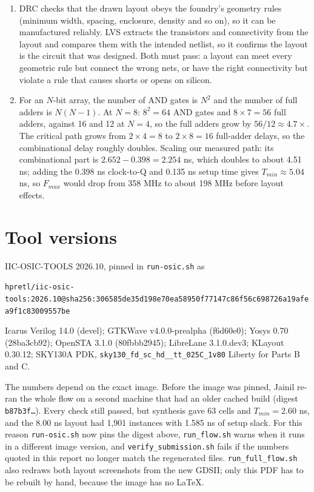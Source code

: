 \documentclass[10pt,a4paper]{article}
\newcommand{\code}[1]{\texttt{#1}}
\begin{document}
\begin{enumerate}[leftmargin=*,label=\textbf{\arabic*.}]
\item DRC checks that the drawn layout obeys the foundry's geometry rules (minimum width, spacing, enclosure, density and so on), so it can be manufactured reliably. LVS extracts the transistors and connectivity from the layout and compares them with the intended netlist, so it confirms the layout is the circuit that was designed. Both must pass: a layout can meet every geometric rule but connect the wrong nets, or have the right connectivity but violate a rule that causes shorts or opens on silicon.
\item For an $N$-bit array, the number of AND gates is $N^2$ and the number of full adders is $N(N-1)$. At $N=8$: $8^2=64$ AND gates and $8\times7=56$ full adders, against 16 and 12 at $N=4$, so the full adders grow by $56/12\approx4.7\times$. The critical path grows from $2\times4=8$ to $2\times8=16$ full-adder delays, so the combinational delay roughly doubles. Scaling our measured path: its combinational part is $2.652-0.398=2.254$ ns, which doubles to about 4.51 ns; adding the 0.398 ns clock-to-Q and 0.135 ns setup time gives $T_{min}\approx5.04$ ns, so $F_{max}$ would drop from 358 MHz to about 198 MHz before layout effects.
\end{enumerate}

\section{Tool versions}\label{sec:tools}
IIC-OSIC-TOOLS 2026.10, pinned in \code{run-osic.sh} as
\begin{center}\small\code{hpretl/iic-osic-tools:2026.10@sha256:306585de35d198e70ea58950f77147c86f56c698726a19afea9f1c83009557be}\end{center}
Icarus Verilog 14.0 (devel); GTKWave v4.0.0-prealpha (f6d60e0); Yosys 0.70 (28ba3cb92); OpenSTA 3.1.0 (80fbbb2945); LibreLane 3.1.0.dev3; KLayout 0.30.12; SKY130A PDK, \code{sky130\_fd\_sc\_hd\_\_tt\_025C\_1v80} Liberty for Parts B and C.

The numbers depend on the exact image. Before the image was pinned, Jainil re-ran the whole flow on a second machine that had an older cached build (digest \code{b87b3f\ldots}). Every check still passed, but synthesis gave 63 cells and $T_{min}=2.60$ ns, and the 8.00 ns layout had 1,901 instances with 1.585 ns of setup slack. For this reason \code{run-osic.sh} now pins the digest above, \code{run\_flow.sh} warns when it runs in a different image version, and \code{verify\_submission.sh} fails if the numbers quoted in this report no longer match the regenerated files. \code{run\_full\_flow.sh} also redraws both layout screenshots from the new GDSII; only this PDF has to be rebuilt by hand, because the image has no LaTeX.
\end{document}
